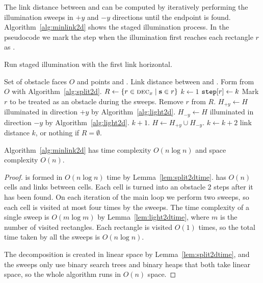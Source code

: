 \documentclass[english,gradu]{tktltiki2018}
\begin{document}
The link distance between \spt and \ept can be computed by iteratively performing the illumination sweeps in $+y$ and $-y$ directions until the endpoint is found.
Algorithm~\ref{alg:minlink2d} shows the staged illumination process.
In the pseudocode we mark the step when the illumination first reaches each rectangle $r$ as .

\begin{algorithm}
\caption{Run staged illumination with the first link horizontal.}\label{alg:minlink2d}
\begin{algorithmic}
\Require Set of obstacle faces $O$ and points \spt and \ept.
\Output Link distance between \spt and \ept.
\State Form  from $O$ with Algorithm~\ref{alg:split2d}.
\State $R\gets\left\{r\in\textsc{dec}_{x} \mid \textbf{s}\in r\right\}$
\State $k\gets 1$
			\State $\texttt{step}{[r]}\gets k$
			\State Mark $r$ to be treated as an obstacle during the sweeps.
			\State Remove $r$ from $R$.
		\EndIf
	\EndFor
	\State $H_{+y}\gets H$ illuminated in direction $+y$ by Algorithm~\ref{alg:light2d}.
	\State $H_{-y}\gets H$ illuminated in direction $-y$ by Algorithm~\ref{alg:light2d}.
		\State \Return $k+1$.
	\EndIf
	\State $H\gets H_{+y}\cup H_{-y}$.
	\State $k\gets k+2$
\EndWhile
\State \Return link distance $k$, or nothing if $R=\emptyset$.
\end{algorithmic}
\end{algorithm}

\begin{theo}\label{theo:minlink2d}Algorithm~\ref{alg:minlink2d} has time complexity $O(n\log n)$ and space complexity $O(n)$.\end{theo}
\begin{proof}
 is formed in $O(n\log n)$ time by Lemma~\ref{lem:split2dtime}.
 has $O(n)$ cells and links between cells.
Each cell is turned into an obstacle 2 steps after it has been found.
On each iteration of the main loop we perform two sweeps, so each cell is visited at most four times by the sweeps.
The time complexity of a single sweep is $O(m\log m)$ by Lemma~\ref{lem:light2dtime}, where $m$ is the number of visited rectangles.
Each rectangle is visited $O(1)$ times, so the total time taken by all the sweeps is $O(n\log n)$.

The decomposition is created in linear space by Lemma~\ref{lem:split2dtime}, and the sweeps only use binary search trees and binary heaps that both take linear space, so the whole algorithm runs in $O(n)$ space.
\end{proof}
\end{document}
